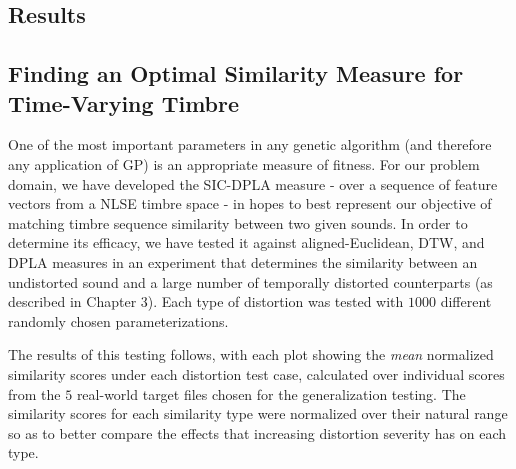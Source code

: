 \documentclass[a4paper,12pt]{report} 	%
\numberwithin{figure}{chapter}
\numberwithin{table}{chapter}
\numberwithin{equation}{chapter}
\begin{document}
\begin{flushleft}
\vspace*{\QuarterPage}
\chapter{Results} %
\section{Finding an Optimal Similarity Measure for Time-Varying Timbre}
One of the most important parameters in any genetic algorithm (and therefore any application of GP) is an appropriate measure of fitness. For our problem domain, we have developed the SIC-DPLA measure - over a sequence of feature vectors from a NLSE timbre space - in hopes to best represent our objective of matching timbre sequence similarity between two given sounds. In order to determine its efficacy, we have tested it against aligned-Euclidean, DTW, and DPLA measures in an experiment that determines the similarity between an undistorted sound and a large number of temporally distorted counterparts (as described in Chapter 3). Each type of distortion was tested with $1000$ different randomly chosen parameterizations.

The results of this testing follows, with each plot showing the \textit{mean} normalized similarity scores under each distortion test case, calculated over individual scores from the $5$ real-world target files chosen for the generalization testing. The similarity scores for each similarity type were normalized over their natural range so as to better compare the effects that increasing distortion severity has on each type.


\end{flushleft}
\end{document}
